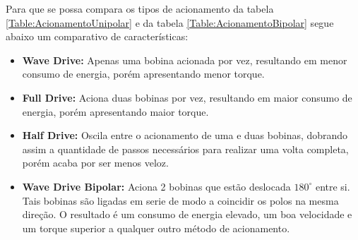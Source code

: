 Para que se possa compara os tipos de acionamento da tabela \ref{Table:AcionamentoUnipolar} e da tabela \ref{Table:AcionamentoBipolar} segue abaixo um comparativo de características:
\begin{itemize}
	\item \textbf{Wave Drive:} Apenas uma bobina acionada por vez, resultando em  menor consumo de energia, porém apresentando menor torque.
	\item \textbf{Full Drive:} Aciona duas bobinas por vez, resultando em  maior consumo de energia, porém apresentando maior torque.
	\item \textbf{Half Drive:} Oscila entre o acionamento de uma e duas bobinas, dobrando assim a  quantidade de passos necessários para realizar uma volta completa, porém acaba por ser menos veloz.
	\item \textbf{Wave Drive Bipolar:} Aciona 2 bobinas que estão deslocada $180^{\circ}$ entre si. Tais bobinas são ligadas em serie de modo a coincidir os polos na mesma direção. O resultado é um consumo de energia elevado, um boa velocidade e um torque superior a qualquer outro método de acionamento.
\end{itemize}
